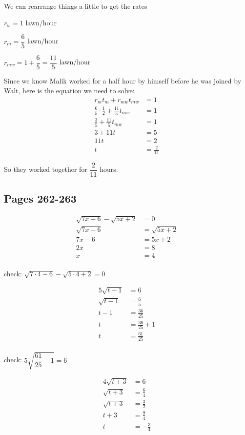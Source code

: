 \documentclass[fleqn,addpoints]{exam}
\begin{document}
\begin{description}
We can rearrange things a little to get the rates
\begin{itemize*}
  \item $r_w = 1$ lawn/hour
  \item $r_m = \dfrac{6}{5}$ lawn/hour
  \item $r_{mw} = 1 + \dfrac{6}{5} = \dfrac{11}{5}$ lawn/hour
\end{itemize*}

Since we know Malik worked for a half hour by himself before he was joined by Walt, here is the equation we need to
solve: 
\begin{align*}
  r_mt_m + r_{mw}t_{mw} &= 1 \\
  \frac{6}{5} \cdot \frac{1}{2} + \frac{11}{5}t_{mw} &= 1 \\
  \frac{3}{5} + \frac{11}{5}t_{mw} &= 1 \\
  3 + 11t &= 5 \\
  11t &= 2 \\
  t &= \frac{2}{11}
\end{align*}

So they worked together for $\dfrac{2}{11}$ hours.

\subsection{Pages 262-263}

\item[20]
\begin{align*}
  \sqrt{7x-6} - \sqrt{5x+2} &= 0 \\
  \sqrt{7x-6} &= \sqrt{5x+2} \\
  7x-6 &= 5x+2 \\
  2x &= 8 \\
  x &= 4 \\
\end{align*}

check: $  \sqrt{7 \cdot 4 - 6} - \sqrt{5 \cdot 4 + 2} = 0 $

\item[21]
\begin{align*}
  5\sqrt{t-1} &= 6 \\
  \sqrt{t-1} &= \frac{6}{5} \\
  t-1 &= \frac{36}{25} \\
  t &= \frac{36}{25} + 1\\
  t &= \frac{61}{25}\\
\end{align*}

check: $5\sqrt{\dfrac{61}{25}-1} = 6 $
\item[22]
\begin{align*}
  4 \sqrt{t+3} &= 6 \\
   \sqrt{t+3} &= \frac{6}{4} \\
   \sqrt{t+3} &= \frac{3}{2} \\
   t+3 &= \frac{9}{4} \\
   t &= - \frac{3}{4}
\end{align*}


\end{description}
\end{document}
